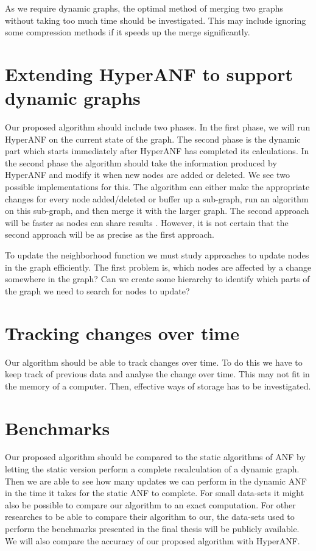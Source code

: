 As we require dynamic graphs, the optimal method of merging two graphs without taking too much time should be investigated. This may include ignoring some compression methods if it speeds up the merge significantly.

\section{Extending HyperANF to support dynamic graphs}
Our proposed algorithm should include two phases. In the first phase, we will run HyperANF on the current state of the graph. The second phase is the dynamic part which starts immediately after HyperANF has completed its calculations.  In the second phase the algorithm should take the information produced by HyperANF and modify it when new nodes are added or deleted. We see two possible implementations for this. The algorithm can either make the appropriate changes for every node added/deleted or buffer up a sub-graph, run an algorithm on this sub-graph, and then merge it with the larger graph. The second approach will be faster as nodes can share results . However, it is not certain that the second approach will be as precise as the first approach. 

To update the neighborhood function we must study approaches to update nodes in the graph efficiently. The first problem is, which nodes are affected by a change somewhere in the graph? Can we create some hierarchy to identify which parts of the graph we need to search for nodes to update? 

\section{Tracking changes over time}
Our algorithm should be able to track changes over time. To do this we have to keep track of previous data and analyse the change over time. This may not fit in the memory of a computer. Then, effective ways of storage has to be investigated.

\section{Benchmarks} 
Our proposed algorithm should be compared to the static algorithms of ANF by letting the static version perform a complete recalculation of a dynamic graph. Then we are able to see how many updates we can perform in the dynamic ANF in the time it takes for the static ANF to complete. For small data-sets it might also be possible to compare our algorithm to an exact computation. For other researches to be able to compare their algorithm to our, the data-sets used to perform the benchmarks presented in the final thesis will be publicly available. We will also compare the accuracy of our proposed algorithm with HyperANF. 





